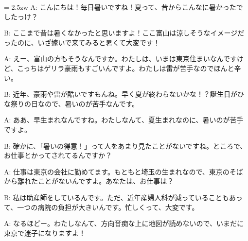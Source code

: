 \documentclass[11pt]{amsart}
\title{}
\author{}
\newenvironment{hangall}[1]{\hangindent = 2.5zw\everypar{\hangindent = 2.5zw}}{}
\begin{document}
\maketitle
\begin{hangall}{}%
A: こんにちは！毎日暑いですね！夏って、昔からこんなに暑かったでしたっけ？



B: ここまで昔は暑くなかったと思いますよ！ここ富山は涼しそうなイメージだったのに、いざ嫁いで来てみると暑くて大変です！



A: えー、富山の方もそうなんですか。わたしは、いまは東京住まいなんですけど、こっちはゲリラ豪雨もすごいんですよ。わたしは雷が苦手なのでほんと辛い。



B: 近年、豪雨や雷が酷いですもんね。早く夏が終わらないかな！？誕生日がひな祭りの日なので、暑いのが苦手なんです。



A: ああ、早生まれなんですね。わたしなんて、夏生まれなのに、暑いのが苦手ですよ。



B: 確かに、「暑いの得意！」って人をあまり見たことがないですね。ところで、お仕事とかってされてるんですか？



A: 仕事は東京の会社に勤めてます。もともと埼玉の生まれなので、東京のそばから離れたことがないんですよ。あなたは、お仕事は？



B: 私は助産師をしているんです。ただ、近年産婦人科が減っていることもあって、一つの病院の負担が大きいんです。忙しくって、大変です。



A: なるほどー。わたしなんて、方向音痴な上に地図が読めないので、いまだに東京で迷子になりますよ！\end{hangall}
\end{document}
